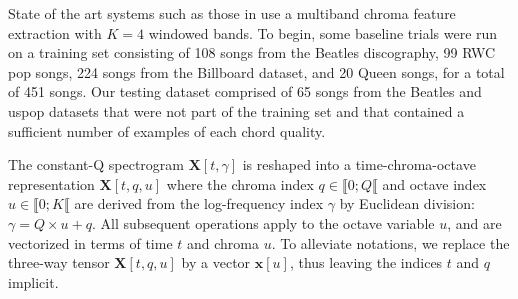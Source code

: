 \documentclass{article}
\begin{document}
State of the art systems such as those in \cite{cho2014on} use a multiband chroma feature
extraction with $K = 4$ windowed bands.
To begin, some baseline trials were run on a training set consisting of 108 songs from the Beatles
discography, 99 RWC pop songs, 224 songs from the Billboard dataset, and 20 Queen songs,
for a total of 451 songs.
Our testing dataset comprised of 65 songs from the Beatles and uspop datasets that were not part
of the training set and that contained a sufficient number of examples of each chord quality. 
		
The constant-Q spectrogram $\boldsymbol{X}[t, \gamma]$ is reshaped into a time-chroma-octave
representation $\boldsymbol{X}[t, q, u]$ where the chroma index $q \in \llbracket 0 ; Q \llbracket$ and
octave index $u \in \llbracket 0 ; K \llbracket$ are derived from the log-frequency index $\gamma$
by Euclidean division: $\gamma = Q \times u + q$.
All subsequent operations apply to the octave variable $u$, and are vectorized in terms of time
$t$ and chroma $u$. To alleviate notations, we replace the three-way tensor $\boldsymbol{X}[t, q, u]$
by a vector $\boldsymbol{x}[u]$, thus leaving the indices $t$ and $q$ implicit.

\end{document}
